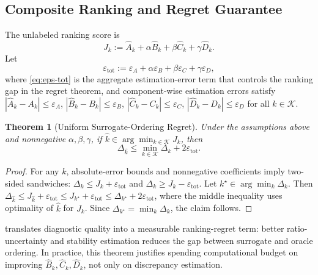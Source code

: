 \documentclass{article} %
\newtheorem{theorem}{Theorem}[section]
\begin{document}
\subsection{Composite Ranking and Regret Guarantee}
The unlabeled ranking score is
\begin{equation}
J_k := \widehat{A}_k + \alpha\widehat{B}_k + \beta\widehat{C}_k + \gamma\widehat{D}_k.
\label{eq:surrogate-score}
\end{equation}
Let
\begin{equation}
\varepsilon_{\mathrm{tot}} := \varepsilon_A + \alpha\varepsilon_B + \beta\varepsilon_C + \gamma\varepsilon_D,
\label{eq:eps-tot}
\end{equation}
where \eqref{eq:eps-tot} is the aggregate estimation-error term that controls the ranking gap in the regret theorem, and component-wise estimation errors satisfy
\(|\widehat{A}_k-A_k|\le\varepsilon_A\),
\(|\widehat{B}_k-B_k|\le\varepsilon_B\),
\(|\widehat{C}_k-C_k|\le\varepsilon_C\),
\(|\widehat{D}_k-D_k|\le\varepsilon_D\)
for all \(k\in\mathcal{K}\).

\begin{theorem}[Uniform Surrogate-Ordering Regret]
\label{thm:ordering}
Under the assumptions above and nonnegative \(\alpha,\beta,\gamma\), if \(\hat k\in\arg\min_{k\in\mathcal{K}} J_k\), then
\begin{equation}
\Delta_{\hat k} \le \min_{k\in\mathcal{K}}\Delta_k + 2\varepsilon_{\mathrm{tot}}.
\label{eq:ordering-bound}
\end{equation}
\end{theorem}

\begin{proof}
For any \(k\), absolute-error bounds and nonnegative coefficients imply two-sided sandwiches:
\(\Delta_k\le J_k+\varepsilon_{\mathrm{tot}}\) and
\(\Delta_k\ge J_k-\varepsilon_{\mathrm{tot}}\).
Let \(k^\star\in\arg\min_k\Delta_k\). Then
\(\Delta_{\hat k}\le J_{\hat k}+\varepsilon_{\mathrm{tot}}\le J_{k^\star}+\varepsilon_{\mathrm{tot}}\le \Delta_{k^\star}+2\varepsilon_{\mathrm{tot}}\),
where the middle inequality uses optimality of \(\hat k\) for \(J_k\). Since \(\Delta_{k^\star}=\min_k\Delta_k\), the claim follows.
\end{proof}

 translates diagnostic quality into a measurable ranking-regret term: better ratio-uncertainty and stability estimation reduces the gap between surrogate and oracle ordering. In practice, this theorem justifies spending computational budget on improving \(\widehat{B}_k,\widehat{C}_k,\widehat{D}_k\), not only on discrepancy estimation.
\end{document}
